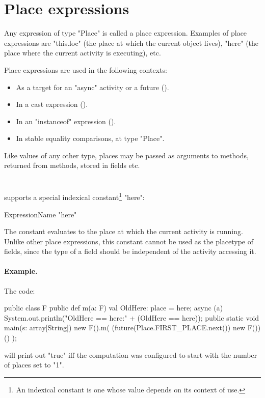 \section{Place expressions}
Any expression of type \xcd"Place" is called a place expression. 
Examples of place expressions are \xcd"this.loc" (the place
at which the current object lives), \xcd"here"
(the place where the current activity is executing), etc.

Place expressions are used in the following contexts: 
\begin{itemize}
\item As a target for an \xcd"async" activity or a future
().
\item In a cast expression ().
\item In an \xcd"instanceof" expression ().
\item In stable equality comparisons, at type \xcd"Place".
\end{itemize}

Like values of any other type, places may be passed as arguments
to methods, returned from methods, stored in fields etc.

\section{}\label{Here}
\Xten{} supports a special indexical constant\footnote{
An indexical constant is one whose value depends on its context
of use.} \xcd"here":

\begin{grammar}
ExpressionName \: \xcd"here" \\
\end{grammar}

The constant evaluates to the place at which the current activity is
running. Unlike other place expressions, this constant cannot be 
used as the placetype of fields, since the type of a field 
should be independent of the activity accessing it.

\paragraph{Example.}
The code:
\begin{xten}
public class F {
  public def m(a: F) {
    val OldHere: place = here;
    async (a) {
      System.out.println("OldHere == here:" 
                         + (OldHere == here));
    }
  }
  public static void main(s: array[String]) {
    new F().m( (future(Place.FIRST_PLACE.next()) new F())() );
  }
}  
\end{xten}
\noindent will print out \xcd"true" iff the computation was configured
to start with the number of places set to \xcd"1". 


